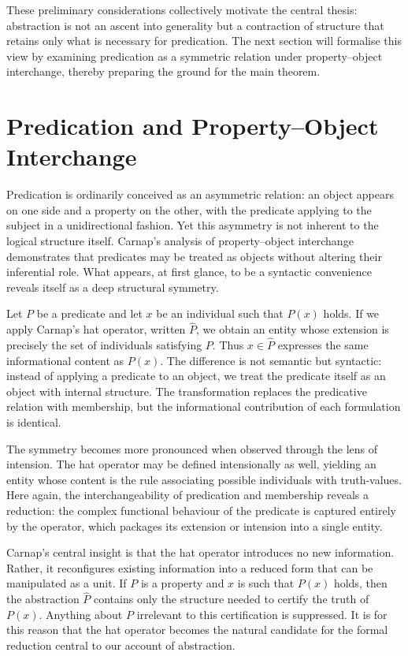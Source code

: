 \documentclass[12pt,letterpaper]{article}
\begin{document}
These preliminary considerations collectively motivate the central thesis: abstraction is not an ascent into generality but a contraction of structure that retains only what is necessary for predication. The next section will formalise this view by examining predication as a symmetric relation under property–object interchange, thereby preparing the ground for the main theorem.

\section{Predication and Property–Object Interchange}

Predication is ordinarily conceived as an asymmetric relation: an object appears on one side and a property on the other, with the predicate applying to the subject in a unidirectional fashion. Yet this asymmetry is not inherent to the logical structure itself. Carnap’s analysis of property–object interchange demonstrates that predicates may be treated as objects without altering their inferential role. What appears, at first glance, to be a syntactic convenience reveals itself as a deep structural symmetry.

Let $P$ be a predicate and let $x$ be an individual such that $P(x)$ holds. If we apply Carnap’s hat operator, written $\hat{P}$, we obtain an entity whose extension is precisely the set of individuals satisfying $P$. Thus $x \in \hat{P}$ expresses the same informational content as $P(x)$. The difference is not semantic but syntactic: instead of applying a predicate to an object, we treat the predicate itself as an object with internal structure. The transformation replaces the predicative relation with membership, but the informational contribution of each formulation is identical.

The symmetry becomes more pronounced when observed through the lens of intension. The hat operator may be defined intensionally as well, yielding an entity whose content is the rule associating possible individuals with truth-values. Here again, the interchangeability of predication and membership reveals a reduction: the complex functional behaviour of the predicate is captured entirely by the operator, which packages its extension or intension into a single entity.

Carnap’s central insight is that the hat operator introduces no new information. Rather, it reconfigures existing information into a reduced form that can be manipulated as a unit. If $P$ is a property and $x$ is such that $P(x)$ holds, then the abstraction $\hat{P}$ contains only the structure needed to certify the truth of $P(x)$. Anything about $P$ irrelevant to this certification is suppressed. It is for this reason that the hat operator becomes the natural candidate for the formal reduction central to our account of abstraction.
\end{document}

